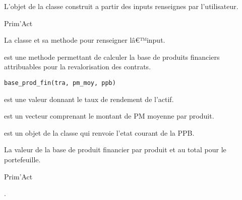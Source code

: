 \documentclass[a4paper]{book}
\begin{document}
%
\begin{Value}
L'objet de la classe  construit a partir des inputs renseignes par l'utilisateur.
\end{Value}
%
\begin{Author}\relax
Prim'Act
\end{Author}
%
\begin{SeeAlso}\relax
La classe  et sa methode 
pour renseigner lâ€™input.
\end{SeeAlso}
%
\begin{Description}\relax
{} est une methode permettant de calculer la base de produits financiers attribuables
pour la revalorisation des contrats.
\end{Description}
%
\begin{Usage}
\begin{verbatim}
base_prod_fin(tra, pm_moy, ppb)
\end{verbatim}
\end{Usage}
%
\begin{Arguments}
\begin{ldescription}
\item[\code{tra}] est une valeur  donnant le taux de rendement de l'actif.

\item[\code{pm\_moy}] est un vecteur  comprenant le montant de PM moyenne par produit.

\item[\code{ppb}] est un objet de la classe  qui renvoie l'etat courant de la PPB.
\end{ldescription}
\end{Arguments}
%
\begin{Value}
La valeur de la base de produit financier par produit et au total pour le portefeuille.
\end{Value}
%
\begin{Author}\relax
Prim'Act
\end{Author}
%
\begin{SeeAlso}\relax
{}.
\end{SeeAlso}
\end{document}
